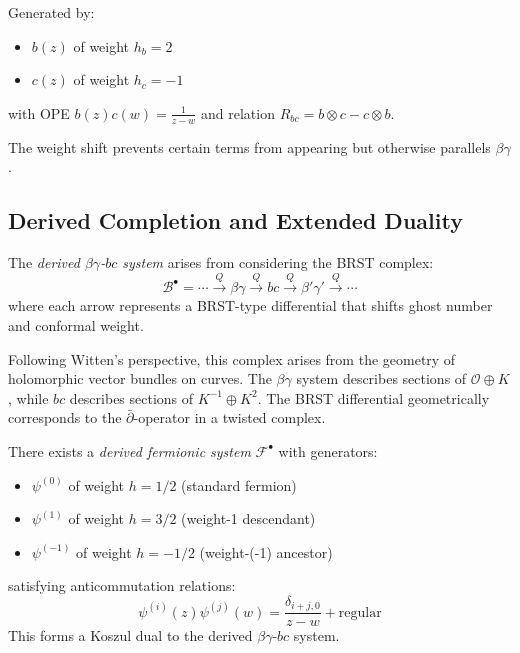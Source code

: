\begin{definition}
Generated by:
\begin{itemize}
\item $b(z)$ of weight $h_b = 2$
\item $c(z)$ of weight $h_c = -1$
\end{itemize}
with OPE $b(z)c(w) = \frac{1}{z-w}$ and relation $R_{bc} = b \otimes c - c \otimes b$.
\end{definition}
 
The weight shift prevents certain terms from appearing but otherwise parallels $\beta\gamma$.
 
\subsection{Derived Completion and Extended Duality}

\begin{definition}\label{def:derived-bg-bc}
The \emph{derived $\beta\gamma$-$bc$ system} arises from considering the BRST complex:
\[
\mathcal{B}^{\bullet} = \cdots \xrightarrow{Q} \beta\gamma \xrightarrow{Q} bc \xrightarrow{Q} \beta'\gamma' \xrightarrow{Q} \cdots
\]
where each arrow represents a BRST-type differential that shifts ghost number and conformal weight.
\end{definition}

\begin{remark}
Following Witten's perspective, this complex arises from the geometry of holomorphic vector bundles 
on curves. The $\beta\gamma$ system describes sections of $\mathcal{O} \oplus K$, while $bc$ describes 
sections of $K^{-1} \oplus K^2$. The BRST differential geometrically corresponds to the 
$\bar{\partial}$-operator in a twisted complex.
\end{remark}

\begin{theorem}\label{thm:extended-ferm-ghost}
There exists a \emph{derived fermionic system} $\mathcal{F}^{\bullet}$ with generators:
\begin{itemize}
\item $\psi^{(0)}$ of weight $h = 1/2$ (standard fermion)
\item $\psi^{(1)}$ of weight $h = 3/2$ (weight-1 descendant)
\item $\psi^{(-1)}$ of weight $h = -1/2$ (weight-(-1) ancestor)
\end{itemize}
satisfying anticommutation relations:
\[
\psi^{(i)}(z)\psi^{(j)}(w) = \frac{\delta_{i+j,0}}{z-w} + \text{regular}
\]
This forms a Koszul dual to the derived $\beta\gamma$-$bc$ system.
\end{theorem}

